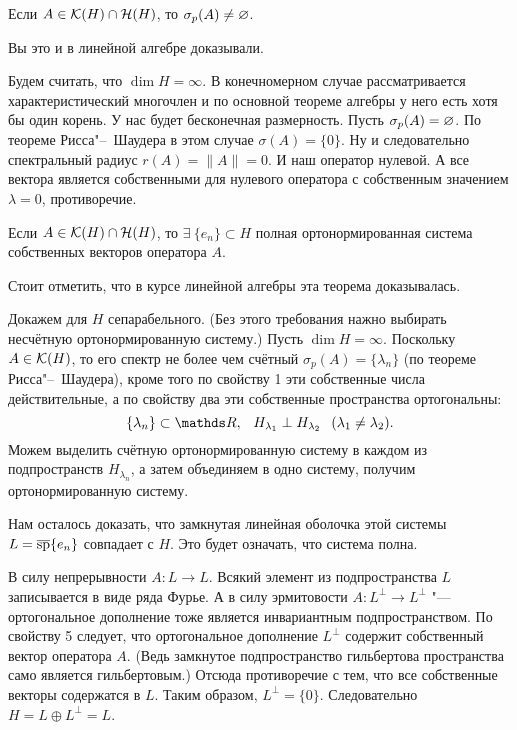 \begin{Ut}
  Если $A\in\mathcal K(H)\cap \mathcal H(H)$, то $\sigma_p(A)\ne\varnothing$. 
\end{Ut}
Вы это и в линейной алгебре доказывали.
\begin{Proof}
  Будем считать, что $\dim H = \infty$. В конечномерном случае рассматривается характеристический многочлен и по основной теореме алгебры у него есть хотя бы один корень. У нас будет бесконечная размерность. Пусть $\sigma_p(A) = \varnothing$. По теореме Рисса"--~Шаудера в этом случае $\sigma(A) = \{0\}$. Ну и следовательно спектральный радиус $r(A) = \|A\| = 0$. И наш оператор нулевой. А все вектора является собственными для нулевого оператора с собственным значением $\lambda=0$, противоречие.
\end{Proof}
\begin{The}
  Если $A\in\mathcal K(H)\cap \mathcal H(H)$, то $\exists\ \{e_n\}\subset H$ полная ортонормированная система собственных векторов оператора $A$.
\end{The}
Стоит отметить, что в курсе линейной алгебры эта теорема доказывалась.
\begin{Proof}
Докажем для $H$ сепарабельного. (Без этого требования нажно выбирать несчётную ортонормированную систему.)
Пусть $\dim H=\infty$. Поскольку $A\in \mathcal K(H)$, то его спектр не более чем счётный $\sigma_p(A) = \{\lambda_n\}$ (по теореме Рисса"--~Шаудера), кроме того по свойству 1 эти собственные числа действительные, а по свойству два эти собственные пространства ортогональны:
\[
  \{\lambda_n\}\subset \R,\pau H_{\lambda_1} \perp H_{\lambda_2}\pau (\lambda_1\ne \lambda_2).
\]
Можем выделить счётную ортонормированную систему в каждом из подпространств $H_{\lambda_n}$, а затем объединяем в одно систему, получим ортонормированную систему.

Нам осталось доказать, что замкнутая линейная оболочка этой системы $L = \overline{\operatorname{\mathrm{\mathop{sp}}}}\{e_n\}$ совпадает с $H$. Это будет означать, что система полна.

В силу непрерывности $A\colon L\to L$. Всякий элемент из подпространства $L$ записывается в виде ряда Фурье. А в силу эрмитовости $A\colon L^\perp \to L^\perp$ "--- ортогональное дополнение тоже является инвариантным подпространством. По свойству 5 следует, что ортогональное дополнение $L^\perp$ содержит собственный вектор оператора $A$. (Ведь замкнутое подпространство гильбертова пространства само является гильбертовым.) Отсюда противоречие с тем, что все собственные векторы содержатся в $L$. Таким образом, $L^\perp = \{0\}$. Следовательно $H = L\oplus L^\perp = L$.
\end{Proof}

